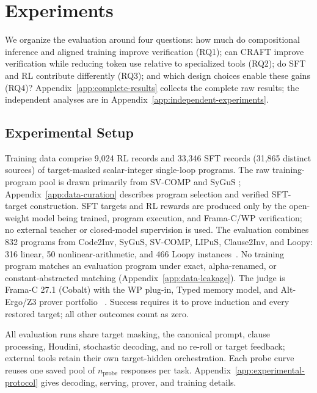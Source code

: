 \section{Experiments}\label{sec:experiments}

We organize the evaluation around four questions: how much do compositional
inference and aligned training improve verification (RQ1); can CRAFT improve verification
while reducing token use relative to specialized tools (RQ2); do SFT and RL
contribute differently (RQ3); and which design choices enable these gains
(RQ4)?  Appendix~\ref{app:complete-results} collects the complete raw results;
the independent analyses are in Appendix~\ref{app:independent-experiments}.

\subsection{Experimental Setup}
\label{sec:exp:setup}

Training data comprise 9,024 RL records and 33,346 SFT records (31,865
distinct sources) of target-masked scalar-integer single-loop programs.
The raw training-program pool is drawn primarily from SV-COMP and SyGuS
\citep{svcomp,alur2013sygus}; Appendix~\ref{app:data-curation} describes
program selection and verified SFT-target construction.  SFT
targets and RL rewards are produced only by the open-weight model being trained,
program execution, and Frama-C/WP verification; no external teacher or
closed-model supervision is used.  The
evaluation combines 832 programs from Code2Inv, SyGuS, SV-COMP, LIPuS,
Clause2Inv, and Loopy: 316 linear, 50 nonlinear-arithmetic, and 466 Loopy
instances~\citep{si2020code2inv,alur2013sygus,svcomp,yu2023lipus,
cao2025clause2inv,kamath2023finding}.  No training program matches an
evaluation program under exact, alpha-renamed, or constant-abstracted matching
(Appendix~\ref{app:data-leakage}).  The judge is Frama-C 27.1 (Cobalt) with
the WP plug-in, Typed memory model, and Alt-Ergo/Z3 prover portfolio
~\citep{framac}.  Success requires it to prove induction and every restored
target; all other outcomes count as zero.

All \sam{} evaluation runs share target masking, the canonical prompt, clause
processing, Houdini, stochastic decoding, and no re-roll or target feedback;
external tools retain their own target-hidden orchestration.  Each probe curve reuses one
saved pool of \(n_{\mathrm{probe}}\) responses per task.  Appendix~\ref{app:experimental-protocol}
gives decoding, serving, prover, and training details.

